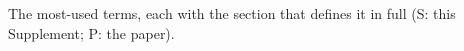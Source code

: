 \documentclass[11pt]{article}
\begin{document}
\clearpage
{} The most-used terms, each with the section that defines it in
full (S: this Supplement; P: the paper).\par\smallskip
\end{document}
